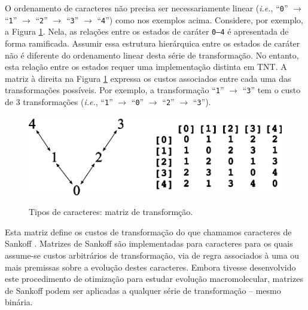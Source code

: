 \begin{refsection}
O ordenamento de caracteres não precisa ser necessariamente linear (\textit{i.e.}, ``\texttt{0}'' $\rightarrow$ ``\texttt{1}'' $\rightarrow$ ``\texttt{2}'' $\rightarrow$ ``\texttt{3}'' $\rightarrow$ ``\texttt{4}'') como nos exemplos acima. Considere, por exemplo, a Figura \ref{tut6:fig:chartypes_matrix}. Nela, as relações entre os estados de caráter \texttt{0--4} é apresentada de forma ramificada. Assumir essa estrutura hierárquica entre os estados de caráter não é diferente do ordenamento linear desta série de transformação. No entanto, esta relação entre os estados requer uma implementação distinta em TNT. A matriz à direita na Figura \ref{tut6:fig:chartypes_matrix} expressa os custos associados entre cada uma das transformações possíveis. Por exemplo, a transformação ``\texttt{1}'' $\rightarrow$ ``\texttt{3}'' tem o custo de 3 transformações (\textit{i.e.}, ``\texttt{1}'' $\rightarrow$ ``\texttt{0}'' $\rightarrow$ ``\texttt{2}'' $\rightarrow$ ``\texttt{3}'').


  \begin{figure}[H]
      {\includegraphics[scale=1.00]{figures/tut6/character_types_matrix.eps}}
	{\caption[Tipos de caracteres: matriz de transformção]{Tipos de caracteres: matriz de transformção.}\label{tut6:fig:chartypes_matrix}}
  \end{figure}


Esta matriz define os custos de transformação do que chamamos caracteres de Sankoff \parencite{Sankoff_1975}. Matrizes de Sankoff são implementadas para caracteres para os quais assume-se custos arbitrários de transformação, via de regra associados à uma ou mais premissas sobre a evolução destes caracteres. Embora \textcite{Sankoff_1975} tivesse desenvolvido este procedimento de otimização para estudar evolução macromolecular, matrizes de Sankoff podem ser aplicadas a qualquer série de transformação -- mesmo binária.


\end{refsection}
